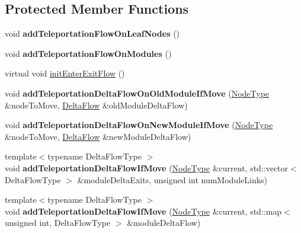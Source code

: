 \subsection*{Protected Member Functions}
\begin{DoxyCompactItemize}
\item 
\mbox{\label{classInfomapGreedySpecialized_ab0687122e7aca86d3644802da9435389}} 
void {\bfseries add\+Teleportation\+Flow\+On\+Leaf\+Nodes} ()
\item 
\mbox{\label{classInfomapGreedySpecialized_a8ed422ef6adedd65703ef29cb258e4d5}} 
void {\bfseries add\+Teleportation\+Flow\+On\+Modules} ()
\item 
virtual void \mbox{\hyperlink{classInfomapGreedySpecialized_ab1ccbef79b7e94cf2762aa5a94a28965}{init\+Enter\+Exit\+Flow}} ()
\item 
\mbox{\label{classInfomapGreedySpecialized_a1d9a4d72c7de6f26100404eb8374fe67}} 
void {\bfseries add\+Teleportation\+Delta\+Flow\+On\+Old\+Module\+If\+Move} (\mbox{\hyperlink{classNode}{Node\+Type}} \&node\+To\+Move, \mbox{\hyperlink{structDeltaFlow}{Delta\+Flow}} \&old\+Module\+Delta\+Flow)
\item 
\mbox{\label{classInfomapGreedySpecialized_a70d972f56b7e75ad7560b6aeb2e83006}} 
void {\bfseries add\+Teleportation\+Delta\+Flow\+On\+New\+Module\+If\+Move} (\mbox{\hyperlink{classNode}{Node\+Type}} \&node\+To\+Move, \mbox{\hyperlink{structDeltaFlow}{Delta\+Flow}} \&new\+Module\+Delta\+Flow)
\item 
\mbox{\label{classInfomapGreedySpecialized_a48f09b206d12d895ecbf192c10f87733}} 
{\footnotesize template$<$typename Delta\+Flow\+Type $>$ }\\void {\bfseries add\+Teleportation\+Delta\+Flow\+If\+Move} (\mbox{\hyperlink{classNode}{Node\+Type}} \&current, std\+::vector$<$ Delta\+Flow\+Type $>$ \&module\+Delta\+Exits, unsigned int num\+Module\+Links)
\item 
\mbox{\label{classInfomapGreedySpecialized_a17350f602093d70fca05bca4000d41b6}} 
{\footnotesize template$<$typename Delta\+Flow\+Type $>$ }\\void {\bfseries add\+Teleportation\+Delta\+Flow\+If\+Move} (\mbox{\hyperlink{classNode}{Node\+Type}} \&current, std\+::map$<$ unsigned int, Delta\+Flow\+Type $>$ \&module\+Delta\+Flow)

\end{DoxyCompactItemize}
